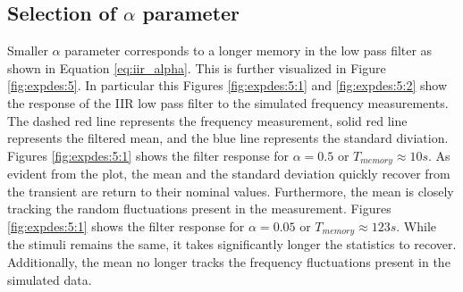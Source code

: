 \subsection{Selection of $\alpha$ parameter}\label{subsec:selectrion-ofparameter}
Smaller $\alpha$ parameter corresponds to a longer memory in the low pass filter as shown in Equation \ref{eq:iir_alpha}.
This is further visualized in Figure \ref{fig:expdes:5}.
In particular this Figures \ref{fig:expdes:5:1} and \ref{fig:expdes:5:2} show the response of the IIR low pass filter to the simulated frequency measurements.
The dashed red line represents the frequency measurement, solid red line represents the filtered mean, and the blue line represents the standard diviation.
Figures \ref{fig:expdes:5:1} shows the filter response for $\alpha = 0.5$ or $T_{memory} \approx 10s $.
As evident from the plot, the mean and the standard deviation quickly recover from the transient are return to their nominal values.
Furthermore, the mean is closely tracking the random fluctuations present in the measurement.
Figures \ref{fig:expdes:5:1} shows the filter response for $\alpha = 0.05$ or $T_{memory} \approx 123s $.
While the stimuli remains the same, it takes significantly longer the statistics to recover.
Additionally, the mean no longer tracks the frequency fluctuations present in the simulated data.

